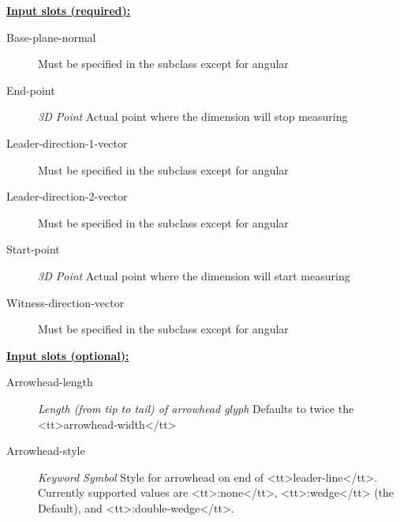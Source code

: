 \documentclass [11pt]{book}
\begin{document}
\begin{itemize}
\begin{description}
\end{description}








\textbf{
\underline{Input slots (required):}}

\begin{description}

\item [Base-plane-normal]
Must be specified in the subclass except for angular


\item [End-point]
\emph{3D Point} Actual point where the dimension will stop measuring


\item [Leader-direction-1-vector]
Must be specified in the subclass except for angular


\item [Leader-direction-2-vector]
Must be specified in the subclass except for angular


\item [Start-point]
\emph{3D Point} Actual point where the dimension will start measuring


\item [Witness-direction-vector]
Must be specified in the subclass except for angular


\end{description}






\textbf{
\underline{Input slots (optional):}}

\begin{description}

\item [Arrowhead-length]
\emph{Length (from tip to tail) of arrowhead glyph} Defaults to twice the <tt>arrowhead-width</tt>


\item [Arrowhead-style]
\emph{Keyword Symbol} Style for arrowhead on end of <tt>leader-line</tt>. Currently supported values
are <tt>:none</tt>, <tt>:wedge</tt>  (the Default), and <tt>:double-wedge</tt>.



\end{description}
\end{itemize}
\end{document}
